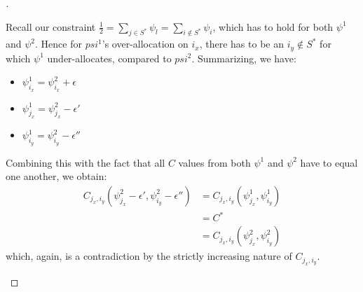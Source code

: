 \begin{proof}[]
\begin{enumerate}[(i)]
\begin{itemize}
      Recall our constraint $\frac{1}{2} = \sum_{j \in S^*} \psi_l = \sum_{i \notin S^*} \psi_i$, which has to hold for both $\psi^1$ and $\psi^2$.
      Hence for $psi^1$'s over-allocation on $i_x$, there has to be an $i_y \notin S^*$ for which $\psi^1$ under-allocates, compared to $psi^2$.
      Summarizing, we have:
      \begin{itemize}
        \item $\psi^1_{i_x} = \psi^2_{i_x} + \epsilon$
        \item $\psi^1_{j_x} = \psi^2_{j_x} - \epsilon'$
        \item $\psi^1_{i_y} = \psi^2_{i_y} - \epsilon''$
      \end{itemize}
      Combining this with the fact that all $C$ values from both $\psi^1$ and $\psi^2$ have to equal one another, we obtain:
      \begin{align}
        C_{j_x, i_y}(\psi^2_{j_x} - \epsilon', \psi^2_{i_y} - \epsilon'') &= C_{j_x, i_y}(\psi^1_{j_x}, \psi^1_{i_y}) \\
        &= C^* \\
        &= C_{j_x, i_y}(\psi^2_{j_x}, \psi^2_{i_y})
      \end{align}
      which, again, is a contradiction by the strictly increasing nature of $C_{j_x, i_y}$.
    \end{itemize}
  \end{enumerate}
\end{proof}


